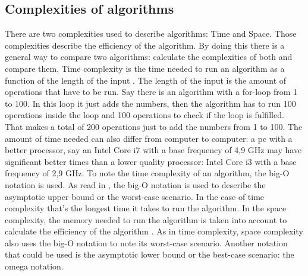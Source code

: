 \subsection{Complexities of algorithms}
\label{subsec:Complexities}
There are two complexities used to describe algorithms: Time and Space. Those complexities describe the efficiency of the algorithm. By doing this there is a general way to compare two algorithms: calculate the complexities of both and compare them.
Time complexity is the time needed to run an algorithm as a function of the length of the input \autocite{Timecomp}. The length of the input is the amount of operations that have to be run. Say there is an algorithm with a for-loop from 1 to 100.
In this loop it just adds the numbers, then the algorithm has to run 100 operations inside the loop and 100 operations to check if the loop is fulfilled. That makes a total of 200 operations just to add the numbers from 1 to 100.
The amount of time needed can also differ from computer to computer: a pc with a better processor, say an Intel Core i7 with a base frequency of 4,9 GHz may have significant better times than a lower quality processor: Intel Core i3 with a base frequency of 2,9 GHz.
To note the time complexity of an algorithm, the big-O notation is used. As read in \textcite{Hidary_2019}, the big-O notation is used to describe the asymptotic upper bound or the worst-case scenario. In the case of time complexity that's the longest time it takes to run the algorithm.
In the space complexity, the memory needed to run the algorithm is taken into account to calculate the efficiency of the algorithm \autocite{Abhishek2021Ruimte}. As in time complexity, space complexity also uses the big-O notation to note its worst-case scenario. Another notation that could be used is the asymptotic lower bound or the best-case scenario: the omega notation.

